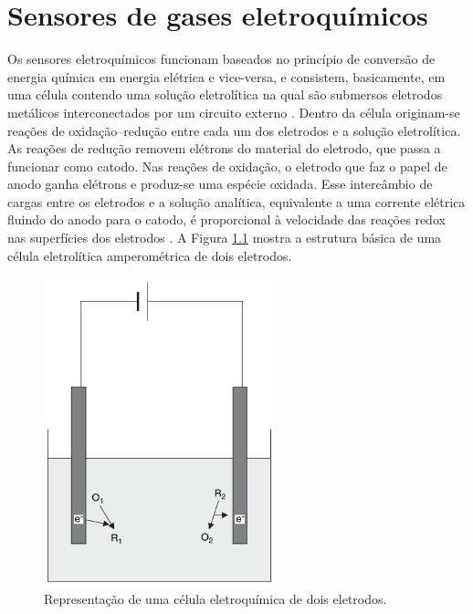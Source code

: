 \chapter{Sensores de gases eletroquímicos}\label{apendix: sensores-ec}

Os sensores eletroquímicos funcionam baseados no princípio de conversão de energia química em energia elétrica e vice-versa, e consistem, basicamente, em uma célula contendo uma solução eletrolítica na qual são submersos eletrodos metálicos interconectados por um circuito externo \cite{Westbroek2005FundamentalsElectrochemistry}. Dentro da célula originam-se reações de oxidação–redução entre cada um dos eletrodos e a solução eletrolítica. As reações de redução removem elétrons do material do eletrodo, que passa a funcionar como catodo. Nas reações de oxidação, o eletrodo que faz o papel de anodo ganha elétrons e produz-se uma espécie oxidada. Esse intercâmbio de cargas entre os eletrodos e a solução analítica, equivalente a uma corrente elétrica fluindo do anodo para o catodo, é proporcional à velocidade das reações redox nas superfícies dos eletrodos \cite{R.Stetter2008AmperometricReview}. A Figura \ref{fig:celula-ec} mostra a estrutura básica de uma célula eletrolítica amperométrica de dois eletrodos.

\begin{figure}[htb]
	\caption{\label{fig:celula-ec}Representação de uma célula eletroquímica de dois eletrodos.}
	\begin{center}
		\includegraphics[width=0.6\textwidth]{aftertext/Operação sensores/Figuras/celula eletroquimica.PNG}
	\end{center}
\end{figure}


